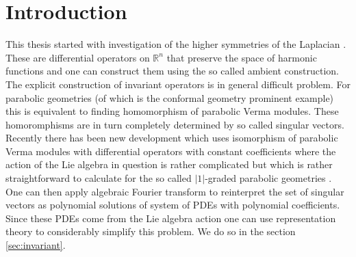 \chapter*{Introduction}

This thesis started with investigation of the higher symmetries of the Laplacian \cite{eastwood_higher_2005, tucek_construction_2011}. These are differential operators on $\mathbb{R}^n$ that preserve the space of harmonic functions and one can construct them using the so called ambient construction. The explicit construction of invariant operators is in general difficult problem. For parabolic geometries (of which is the conformal geometry prominent example) this is equivalent to finding homomorphism of parabolic Verma modules. These homoromphisms are in turn completely determined by so called singular vectors. Recently there has been new development which uses isomorphism of parabolic Verma modules with differential operators with constant coefficients where the action of the Lie algebra in question is rather complicated \cite{krizka_invariant_2017} but which is rather straightforward to calculate for the so called $|1|$-graded parabolic geometries \cite{kobayashi_branching_2015}. One can then apply algebraic Fourier transform to reinterpret the set of singular vectors as polynomial solutions of system of PDEs with polynomial coefficients. Since these PDEs come from the Lie algebra action one can use representation theory to considerably simplify this problem. We do so in the section \ref{sec:invariant}. 


